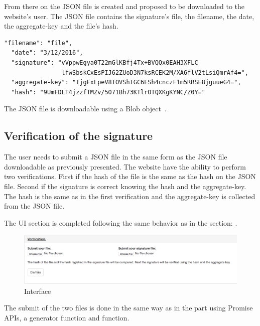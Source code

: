 \documentclass[11pt, a4paper, twoside, openright, openany]{book} %
\begin{document}
From there on the JSON file is created and proposed to be downloaded to the website's user.
The JSON file contains the signature's file, the filename, the date, the aggregate-key and the file's hash.
\bigbreak

\begin{lstlisting}[caption={Example a downloadable JSON file}, captionpos=b]
  "filename": "file",
  "date": "3/12/2016",
  "signature": "vVppwEgya0T22mGlKBfj4Tx+BVQQx0EAH3XFLC
                lfwSbskCxEsPIJ62ZUoD3N7ksRCEK2M/XA6flV2tLsiQmrAf4=",
  "aggregate-key": "IjgFxLpeV8IOVShIGC6ESh4cnczF1m5RRSE8jguueG4=",
  "hash": "9UmFDLT4jzzfTMZv/5O71Bh73KTlrOTQXKgKYNC/Z0Y="
\end{lstlisting}
\leavevmode \newline

The JSON file is downloadable using a Blob object~\cite{blob}.
\bigbreak

\subsection{Verification of the signature}
The user needs to submit a JSON file in the same form as the JSON file downloadable
as previously presented. The website have the ability to perform two verifications.
\newline
First if the hash of the file is the same as the hash on the JSON file. Second if the signature
is correct knowing the hash and the aggregate-key. The hash is the same as in the first verification
and the aggregate-key is collected from the JSON file.
\bigbreak

The UI section is completed following the same behavior as in the section: .
\bigbreak

\begin{figure}[ht!]
\centering
\includegraphics[width=125mm]{verification_verification.jpg}
\caption{Interface}
\end{figure}
\leavevmode \newline

The submit of the two files is done in the same way as in the  part
using Promise APIs, a generator function and  function.
\bigbreak
\end{document}
